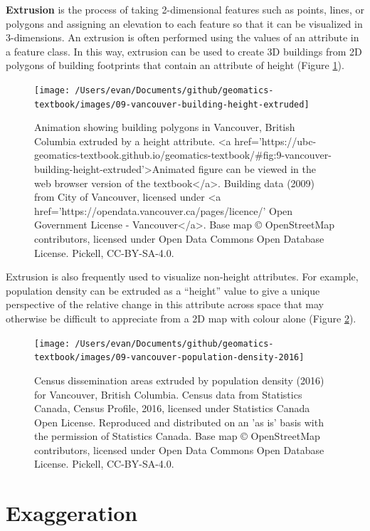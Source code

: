 \documentclass[
]{book}
\begin{document}
\textbf{Extrusion} is the process of taking 2-dimensional features such as points, lines, or polygons and assigning an elevation to each feature so that it can be visualized in 3-dimensions. An extrusion is often performed using the values of an attribute in a feature class. In this way, extrusion can be used to create 3D buildings from 2D polygons of building footprints that contain an attribute of height (Figure \ref{fig:9-vancouver-building-height-extruded}).

\begin{figure}
\texttt{[image: /Users/evan/Documents/github/geomatics-textbook/images/09-vancouver-building-height-extruded]} \caption{Animation showing building polygons in Vancouver, British Columbia extruded by a height attribute. <a href='https://ubc-geomatics-textbook.github.io/geomatics-textbook/#fig:9-vancouver-building-height-extruded'>Animated figure can be viewed in the web browser version of the textbook</a>. Building data (2009) from City of Vancouver, licensed under <a href='https://opendata.vancouver.ca/pages/licence/' Open Government License - Vancouver</a>. Base map © OpenStreetMap contributors, licensed under Open Data Commons Open Database License. Pickell, CC-BY-SA-4.0.}\label{fig:9-vancouver-building-height-extruded}
\end{figure}

Extrusion is also frequently used to visualize non-height attributes. For example, population density can be extruded as a ``height'' value to give a unique perspective of the relative change in this attribute across space that may otherwise be difficult to appreciate from a 2D map with colour alone (Figure \ref{fig:9-vancouver-population-density-2016}).

\begin{figure}
\texttt{[image: /Users/evan/Documents/github/geomatics-textbook/images/09-vancouver-population-density-2016]} \caption{Census dissemination areas extruded by population density (2016) for Vancouver, British Columbia. Census data from Statistics Canada, Census Profile, 2016, licensed under Statistics Canada Open License. Reproduced and distributed on an 'as is' basis with the permission of Statistics Canada. Base map © OpenStreetMap contributors, licensed under Open Data Commons Open Database License. Pickell, CC-BY-SA-4.0.}\label{fig:9-vancouver-population-density-2016}
\end{figure}

\hypertarget{exaggeration}{%
\section{Exaggeration}\label{exaggeration}}
\end{document}
